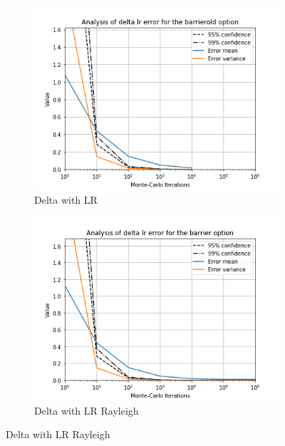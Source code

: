 \documentclass[11pt,a4paper,fleqn]{article}
\begin{document}
\begin{figure}[h!]
  \centering
      \begin{subfigure}[b]{0.45\textwidth}
          \includegraphics[width=\textwidth]{graphs/barrierolddeltalr.png}
          \caption{Delta with LR}
      \end{subfigure}
      \begin{subfigure}[b]{0.45\textwidth}
          \includegraphics[width=\textwidth]{graphs/barrierdeltalr.png}
          \caption{Delta with LR Rayleigh}
      \end{subfigure}


\end{figure}
\end{document}
